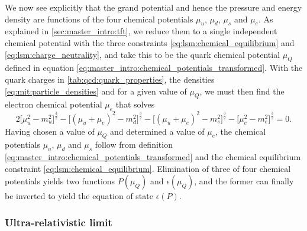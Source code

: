 We now see explicitly that the grand potential and hence the pressure and energy density are functions of the four chemical potentials $\mu_u$, $\mu_d$, $\mu_s$ and $\mu_e$.
As explained in \cref{sec:master_intro:tft},
we reduce them to a single independent chemical potential with the three constraints \eqref{eq:lsm:chemical_equilibrium} and \eqref{eq:lsm:charge_neutrality},
and take this to be the quark chemical potential $\mu_Q$ defined in equation \eqref{eq:master_intro:chemical_potentials_transformed}.
With the quark charges in \cref{tab:qcd:quark_properties}, the densities \eqref{eq:mit:particle_densities} and for a given value of $\mu_Q$,
we must then find the electron chemical potential $\mu_e$ that solves
\begin{equation}
	2 \Big[\mu_u^2-m_u^2\Big]^\frac32
	- \Big[(\mu_u+\mu_e)^2-m_d^2\Big]^\frac32 
	- \Big[(\mu_u+\mu_e)^2-m_s^2\Big]^\frac32 
	- \Big[\mu_e^2-m_e^2\Big]^\frac32 = 0.
\label{eq:mit:charge_neutrality_explicit}
\end{equation}
Having chosen a value of $\mu_Q$ and determined a value of $\mu_e$,
the chemical potentials $\mu_u$, $\mu_d$ and $\mu_s$ follow from definition \eqref{eq:master_intro:chemical_potentials_transformed} and the chemical equilibrium constraint \eqref{eq:lsm:chemical_equilibrium}. 
Elimination of three of four chemical potentials yields two functions $P(\mu_Q)$ and $\epsilon(\mu_Q)$,
and the former can finally be inverted to yield the equation of state $\epsilon(P)$.

\subsubsection{Ultra-relativistic limit}

